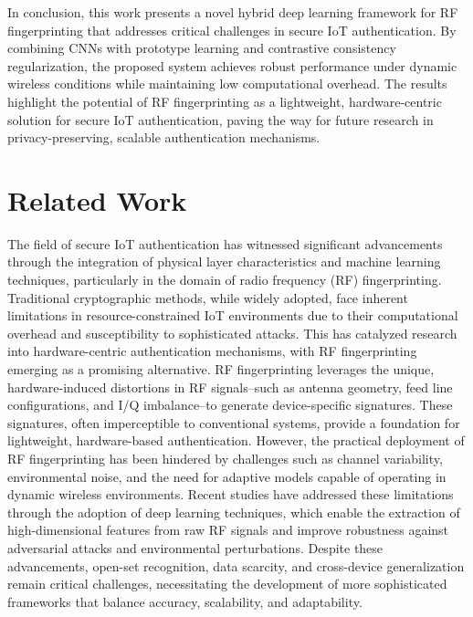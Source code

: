 \documentclass[conference]{IEEEtran}
\begin{document}
In conclusion, this work presents a novel hybrid deep learning framework for RF fingerprinting that addresses critical challenges in secure IoT authentication. By combining CNNs with prototype learning and contrastive consistency regularization, the proposed system achieves robust performance under dynamic wireless conditions while maintaining low computational overhead. The results highlight the potential of RF fingerprinting as a lightweight, hardware-centric solution for secure IoT authentication, paving the way for future research in privacy-preserving, scalable authentication mechanisms.

\section{Related Work}

The field of secure IoT authentication has witnessed significant advancements through the integration of physical layer characteristics and machine learning techniques, particularly in the domain of radio frequency (RF) fingerprinting. Traditional cryptographic methods, while widely adopted, face inherent limitations in resource-constrained IoT environments due to their computational overhead and susceptibility to sophisticated attacks. This has catalyzed research into hardware-centric authentication mechanisms, with RF fingerprinting emerging as a promising alternative. RF fingerprinting leverages the unique, hardware-induced distortions in RF signals--such as antenna geometry, feed line configurations, and I/Q imbalance--to generate device-specific signatures. These signatures, often imperceptible to conventional systems, provide a foundation for lightweight, hardware-based authentication. However, the practical deployment of RF fingerprinting has been hindered by challenges such as channel variability, environmental noise, and the need for adaptive models capable of operating in dynamic wireless environments. Recent studies have addressed these limitations through the adoption of deep learning techniques, which enable the extraction of high-dimensional features from raw RF signals and improve robustness against adversarial attacks and environmental perturbations. Despite these advancements, open-set recognition, data scarcity, and cross-device generalization remain critical challenges, necessitating the development of more sophisticated frameworks that balance accuracy, scalability, and adaptability.
\end{document}
